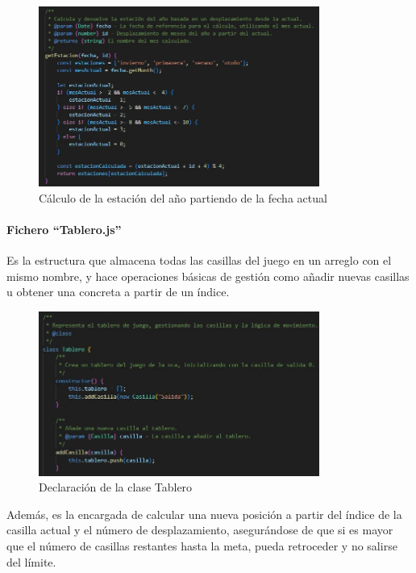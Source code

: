 \begin{figure}[H]
	\centering
	\includegraphics[width=0.82\textwidth]{imgs/codigo-casillas-8.jpg}
	\caption{Cálculo de la estación del año partiendo de la fecha actual}
	\label{fig:codigo-casillas-8}
\end{figure}

\paragraph{Fichero \enquote{Tablero.js}}

Es la estructura que almacena todas las casillas del juego en un arreglo con el mismo nombre, y hace operaciones básicas de gestión como añadir nuevas casillas u obtener una concreta a partir de un índice.

\begin{figure}[H]
	\centering
	\includegraphics[width=0.82\textwidth]{imgs/codigo-tablero-1.jpg}
	\caption{Declaración de la clase Tablero}
	\label{fig:codigo-tablero-1}
\end{figure}

\newpage
Además, es la encargada de calcular una nueva posición a partir del índice de la casilla actual y el número de desplazamiento, asegurándose de que si es mayor que el número de casillas restantes hasta la meta, pueda retroceder y no salirse del límite.

